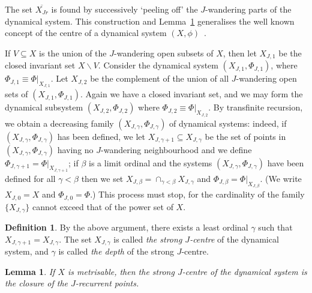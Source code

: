 \documentclass[12pt]{amsart}
\newtheorem{lemma}[theorem]{Lemma}
\theoremstyle{definition}
\newtheorem{definition}[theorem]{Definition}
\begin{document}
The set $\overline{X_{Jr}}$ is found by successively `peeling off'
the $J$-wandering parts of the dynamical system. This construction
and Lemma~\ref{cent2} generalises the well
known concept of the centre of a dynamical system
$(X,\phi)$~\cite[7.19]{GottschalkHed55}.


If $V\subseteq X$ is the union of the $J$-wandering open subsets
of $X$, then let $X_{J,1}$ be the closed invariant set
$X\backslash V$. Consider the dynamical system $(X_{J,1},\Phi_{J,1})$,
where $\Phi_{J,1}\equiv\Phi|_{X_{J,1}}$. Let $X_{J,2}$ be the
complement of the union of all $J$-wandering open sets of
$(X_{J,1},\Phi_{J,1})$. Again we have a closed invariant set, and we
may form the dynamical subsystem $(X_{J,2},\Phi_{J,2})$ where
$\Phi_{J,2}\equiv \Phi|_{X_{J,2}}$. By transfinite recursion, we obtain a
decreasing family $(X_{J,\gamma},\Phi_{J,\gamma})$ of dynamical
systems: indeed, if $(X_{J,\gamma},\Phi_{J,\gamma})$ has been
defined, we let $X_{J,\gamma +1}\subseteq X_{J,\gamma}$ be the set
of points in $(X_{J,\gamma},\Phi_{J,\gamma})$ having no
$J$-wandering neighbourhood and we define
$\Phi_{J,\gamma+1}=\Phi|_{X_{J,\gamma+1}}$; if $\beta$ is a limit
ordinal and the systems $(X_{J,\gamma},\Phi_{J,\gamma})$ have been
defined for all $\gamma<\beta$ then we set
$X_{J,\beta}=\cap_{\gamma<\beta }X_{J,\gamma}$ and
$\Phi_{J,\beta}=\Phi|_{X_{J,\beta}}$. (We write $X_{J,0}=X$ and
$\Phi_{J,0}=\Phi$.) This process must stop, for the cardinality of
the family $\{X_{J,\gamma}\}$ cannot exceed that of the power set
of $X$.

\begin{definition}
By the above argument, there exists a least ordinal $\gamma$
such that $X_{J,\gamma+1}=X_{J,\gamma}$.
The set $X_{J,\gamma}$ is called \emph{the strong
$J$-centre} of the dynamical system, and $\gamma$ is called
\emph{the depth} of the strong $J$-centre.
\end{definition}


\begin{lemma} \label{cent2}
If $X$ is metrisable, then the strong $J$-centre of the dynamical
system is the closure of the $J$-recurrent points.
\end{lemma}
\end{document}

